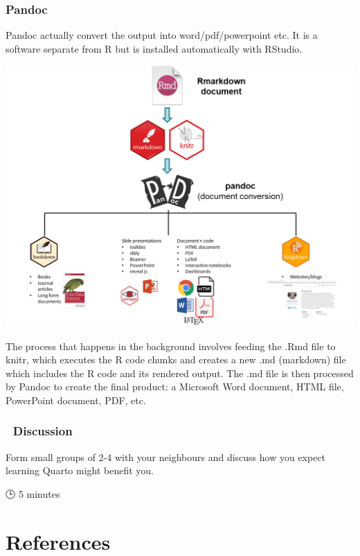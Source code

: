 \documentclass[
  letterpaper,
  DIV=11,
  numbers=noendperiod]{scrreprt}
\begin{document}
\hypertarget{pandoc}{%
\subsubsection{Pandoc}\label{pandoc}}

Pandoc actually convert the output into word/pdf/powerpoint etc. It is a
software separate from R but is installed automatically with RStudio.

\includegraphics{./images/paste-ABFB521E.png}

The process that happens in the background involves feeding the .Rmd
file to knitr, which executes the R code chunks and creates a new .md
(markdown) file which includes the R code and its rendered output. The
.md file is then processed by Pandoc to create the final product: a
Microsoft Word document, HTML file, PowerPoint document, PDF, etc.

\hypertarget{discussion-1}{%
\subsubsection{\texorpdfstring{{💬}
Discussion}{💬 Discussion}}\label{discussion-1}}

Form small groups of 2-4 with your neighbours and discuss how you expect
learning Quarto might benefit you.

{🕒} 5 minutes

\hypertarget{references}{%
\section{References}\label{references}}
\end{document}
